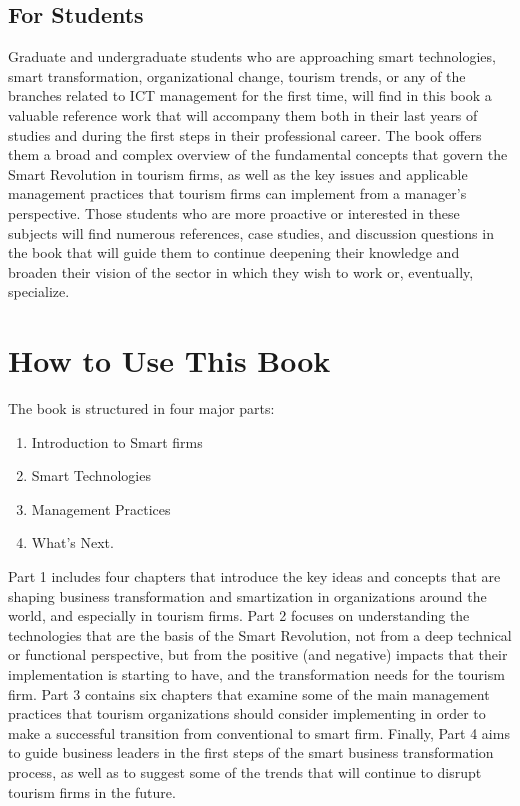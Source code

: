\documentclass[
  letterpaper,
  DIV=11,
  numbers=noendperiod]{scrreprt}
\providecommand{\tightlist}{%
  \setlength{\itemsep}{0pt}\setlength{\parskip}{0pt}}\usepackage{longtable,booktabs,array}
\begin{document}
\hypertarget{for-students}{%
\section{For Students}\label{for-students}}

Graduate and undergraduate students who are approaching smart
technologies, smart transformation, organizational change, tourism
trends, or any of the branches related to ICT management for the first
time, will find in this book a valuable reference work that will
accompany them both in their last years of studies and during the first
steps in their professional career. The book offers them a broad and
complex overview of the fundamental concepts that govern the Smart
Revolution in tourism firms, as well as the key issues and applicable
management practices that tourism firms can implement from a manager's
perspective. Those students who are more proactive or interested in
these subjects will find numerous references, case studies, and
discussion questions in the book that will guide them to continue
deepening their knowledge and broaden their vision of the sector in
which they wish to work or, eventually, specialize.

\hypertarget{how-to-use-this-book}{%
\chapter{How to Use This Book}\label{how-to-use-this-book}}

The book is structured in four major parts:

\begin{enumerate}
\def\labelenumi{\arabic{enumi}.}
\tightlist
\item
  Introduction to Smart firms
\item
  Smart Technologies
\item
  Management Practices
\item
  What's Next.
\end{enumerate}

Part 1 includes four chapters that introduce the key ideas and concepts
that are shaping business transformation and smartization in
organizations around the world, and especially in tourism firms. Part 2
focuses on understanding the technologies that are the basis of the
Smart Revolution, not from a deep technical or functional perspective,
but from the positive (and negative) impacts that their implementation
is starting to have, and the transformation needs for the tourism firm.
Part 3 contains six chapters that examine some of the main management
practices that tourism organizations should consider implementing in
order to make a successful transition from conventional to smart firm.
Finally, Part 4 aims to guide business leaders in the first steps of the
smart business transformation process, as well as to suggest some of the
trends that will continue to disrupt tourism firms in the future.
\end{document}
